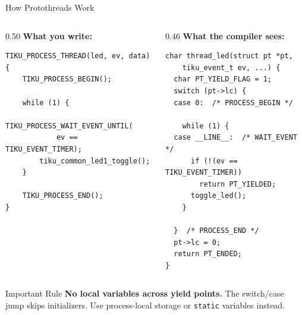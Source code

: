 \documentclass[aspectratio=169, 10pt]{beamer}
\begin{document}
\begin{frame}[fragile]{How Protothreads Work}
\begin{columns}[T]
\begin{column}{0.50\textwidth}
\textbf{What you write:}
\begin{lstlisting}[style=cstyle]
TIKU_PROCESS_THREAD(led, ev, data)
{
    TIKU_PROCESS_BEGIN();

    while (1) {
        TIKU_PROCESS_WAIT_EVENT_UNTIL(
            ev == TIKU_EVENT_TIMER);
        tiku_common_led1_toggle();
    }

    TIKU_PROCESS_END();
}
\end{lstlisting}
\end{column}

\begin{column}{0.46\textwidth}
\textbf{What the compiler sees:}
\begin{lstlisting}[style=cstyle, basicstyle=\ttfamily\tiny]
char thread_led(struct pt *pt,
    tiku_event_t ev, ...) {
  char PT_YIELD_FLAG = 1;
  switch (pt->lc) {
  case 0:  /* PROCESS_BEGIN */

    while (1) {
  case __LINE__:  /* WAIT_EVENT */
      if (!(ev == TIKU_EVENT_TIMER))
        return PT_YIELDED;
      toggle_led();
    }

  }  /* PROCESS_END */
  pt->lc = 0;
  return PT_ENDED;
}
\end{lstlisting}
\end{column}
\end{columns}

\vspace{0.3em}
\begin{alertblock}{Important Rule}
\textbf{No local variables across yield points.}
The switch/case jump skips initializers.
Use process-local storage or \texttt{static} variables instead.
\end{alertblock}
\end{frame}
\end{document}
